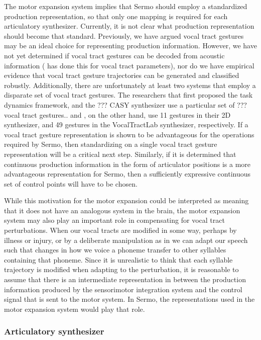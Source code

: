 The motor expansion system implies
that Sermo should employ
a standardized production representation,
so that only one mapping is required
for each articulatory synthesizer.
Currently, it is not clear
what production representation
should become that standard.
Previously, we have argued
vocal tract gestures may be an
ideal choice for representing production information.
However, we have not yet determined
if vocal tract gestures can be decoded
from acoustic information
(\cite{uria2011} has done this for vocal tract parameters),
nor do we have empirical evidence
that vocal tract gesture trajectories
can be generated and classified robustly.
Additionally, there are unfortunately
at least two systems that employ
a disparate set of vocal tract gestures.
The researchers that first proposed
the task dynamics framework,
and the ??? CASY synthesizer
use a particular set of ??? vocal tract gestures..
\cite{kroger2014} and \cite{birkholz2006,birkholz2013},
on the other hand,
use 11 gestures in their 2D synthesizer,
and 49 gestures in the VocalTractLab synthesizer,
respectively.
If a vocal tract gesture representation
is shown to be advantageous
for the operations required by Sermo,
then standardizing on a single
vocal tract gesture representation
will be a critical next step.
Similarly,
if it is determined that
continuous production information
in the form of articulator positions
is a more advantageous representation
for Sermo,
then a sufficiently expressive
continuous set of control points
will have to be chosen.

While this motivation for the
motor expansion could be interpreted
as meaning that it does not
have an analogous system in the brain,
the motor expansion system
may also play an important role
in compensating for vocal tract perturbations.
When our vocal tracts are modified in some way,
perhaps by illness or injury,
or by a deliberate manipulation
as in \cite{houde1998}
we can adapt our speech
such that changes in how we voice a phoneme
transfer to other syllables containing that phoneme.
Since it is unrealistic to think that
each syllable trajectory is modified
when adapting to the perturbation,
it is reasonable to assume that
there is an intermediate representation
in between the production information
produced by the sensorimotor integration system
and the control signal that is sent
to the motor system.
In Sermo, the representations used
in the motor expansion system
would play that role.

\subsubsection{Articulatory synthesizer}

